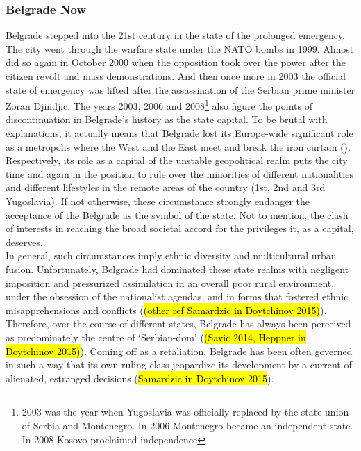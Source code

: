 \documentclass[11pt]{report}
\begin{document}
\subsubsection{Belgrade Now}
Belgrade stepped into the 21st century in the state of the prolonged emergency.
The city went through the warfare state under the NATO bombs in 1999. Almost did so again in October 2000 when the opposition took over the power after the citizen revolt and mass demonstrations.
And then once more in 2003 the official state of emergency was lifted after the assassination of the Serbian prime minister Zoran Djindjic. The years 2003, 2006 and 2008\footnote{2003 was the year when Yugoslavia was officially replaced by the state union of Serbia and Montenegro. In 2006 Montenegro became an independent state. In 2008 Kosovo proclaimed independence}
also figure the points of discontinuation in Belgrade's history as the state capital.
To be brutal with explanations, it actually means that Belgrade lost its Europe-wide significant role as a metropolis where the West and the East meet and break the iron curtain (\cite{(Grozdanic 2008)}).
\\
Respectively, its role as a capital of the unstable geopolitical realm puts the city time and again in the position to rule over the minorities of different nationalities and different lifestyles in the remote areas of the country (1st, 2nd and 3rd Yugoslavia). If not otherwise, these circumstance strongly endanger the acceptance of the Belgrade as the symbol of the state. Not to mention, the clash of interests in reaching the broad societal accord for the privileges it, as a capital, deserves.
\\
In general, such circumstances imply ethnic diversity and multicultural urban fusion.
Unfortunately, Belgrade had dominated these state realms with negligent imposition and pressurized  assimilation in an overall poor  rural  environment, under  the obsession of the nationalist agendas, and in forms  that  fostered ethnic misapprehensions  and  conflicts (\hl{(other ref Samardzic in Doytchinov 2015)}).
Therefore, over the course of different states, Belgrade has always been perceived as predominately the centre of ‘Serbian-dom’ (\hl{(Savic 2014, Heppner in Doytchinov 2015)}).
Coming off as a retaliation, Belgrade has been often governed in such a way that its own ruling class jeopardize its development by a current of alienated, estranged  decisions (\hl{Samardzic in Doytchinov 2015}).
\end{document}
